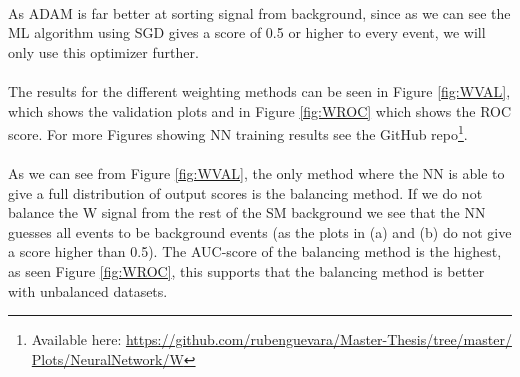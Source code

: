 \documentclass[12pt, a4paper]{book}
\begin{document}
\\As ADAM is far better at sorting signal from background, since as we can see the ML algorithm using SGD gives a score of 0.5 or higher to every event, we will only use this optimizer further.\\
\\The results for the different weighting methods can be seen in Figure \ref{fig:WVAL}, which shows the validation plots and in Figure \ref{fig:WROC} which shows the ROC score. For more Figures showing NN training results see the GitHub repo\footnote{Available here: \href{https://github.com/rubenguevara/Master-Thesis/tree/master/Plots/NeuralNetwork/W}{https://github.com/rubenguevara/Master-Thesis/tree/master/\\Plots/NeuralNetwork/W}}. \\
\\As we can see from Figure \ref{fig:WVAL}, the only method where the NN is able to give a full distribution of output scores is the balancing method. If we do not balance the W signal from the rest of the SM background we see that 
the NN guesses all events to be background events (as the plots in (a) and (b) do not give a score higher than 0.5). The AUC-score of the balancing method is the highest, as seen Figure \ref{fig:WROC}, this supports that the balancing method is better with unbalanced datasets.  
\end{document}

